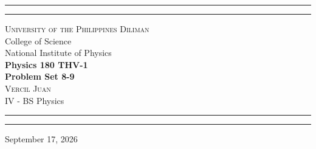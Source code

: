 \begin{titlepage}
    \vspace*{2.5in}
    \hrule
    \vspace{3pt}
    \hrule
    \vspace{0.25in}
    \begin{center}
		{
			\Large 
			\textsc{
				University of the Philippines Diliman
			}
			\\[4pt]
			College of Science
			\\[4pt]
			National Institute of Physics
		}
		\\[0.5cm]
		{
			\Huge
			\textbf{
				Physics 180 THV-1
				\\[5pt]
				Problem Set 8-9
			}
		}
		\\[0.75cm]
		{
			\Large 
			\textsc{
				Vercil Juan
			}
		}\\[5pt] 
		{
			\large 
			IV - BS Physics
		}
    \end{center}
    \vspace{0.25in}
    \hrule
    \vspace{3pt}
    \hrule 
    \vfill
    \begin{center}
    {\large 
		September 17, 2026
	}
    \end{center}
\end{titlepage}
